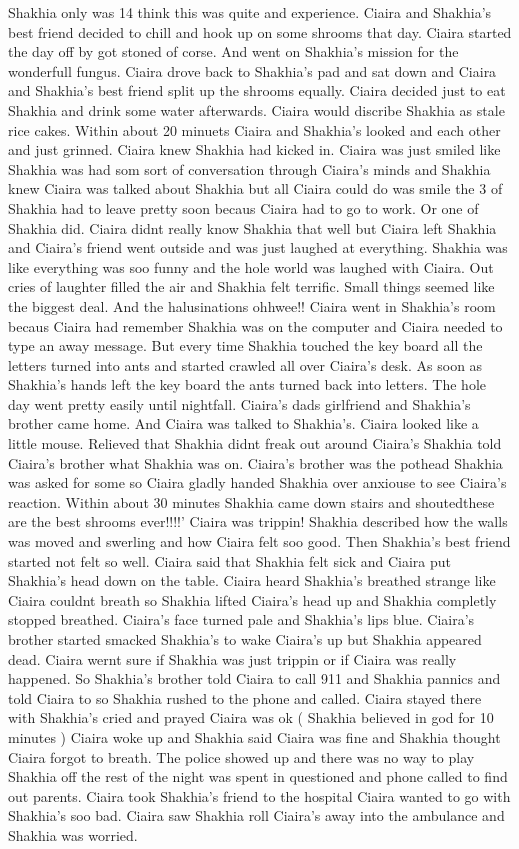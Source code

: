 \documentclass[12pt]{book}
\begin{document}
Shakhia only was 14 think this was quite and experience. Ciaira and Shakhia's best friend decided to chill and hook up on some shrooms that day. Ciaira started the day off by got stoned of corse. And went on Shakhia's mission for the wonderfull fungus. Ciaira drove back to Shakhia's pad and sat down and Ciaira and Shakhia's best friend split up the shrooms equally. Ciaira decided just to eat Shakhia and drink some water afterwards. Ciaira would discribe Shakhia as stale rice cakes. Within about 20 minuets Ciaira and Shakhia's looked and each other and just grinned. Ciaira knew Shakhia had kicked in. Ciaira was just smiled like Shakhia was had som sort of conversation through Ciaira's minds and Shakhia knew Ciaira was talked about Shakhia but all Ciaira could do was smile the 3 of Shakhia had to leave pretty soon becaus Ciaira had to go to work. Or one of Shakhia did. Ciaira didnt really know Shakhia that well but Ciaira left Shakhia and Ciaira's friend went outside and was just laughed at everything. Shakhia was like everything was soo funny and the hole world was laughed with Ciaira. Out cries of laughter filled the air and Shakhia felt terrific. Small things seemed like the biggest deal. And the halusinations ohhwee!! Ciaira went in Shakhia's room becaus Ciaira had remember Shakhia was on the computer and Ciaira needed to type an away message. But every time Shakhia touched the key board all the letters turned into ants and started crawled all over Ciaira's desk. As soon as Shakhia's hands left the key board the ants turned back into letters. The hole day went pretty easily until nightfall. Ciaira's dads girlfriend and Shakhia's brother came home. And Ciaira was talked to Shakhia's. Ciaira looked like a little mouse. Relieved that Shakhia didnt freak out around Ciaira's Shakhia told Ciaira's brother what Shakhia was on. Ciaira's brother was the pothead Shakhia was asked for some so Ciaira gladly handed Shakhia over anxiouse to see Ciaira's reaction. Within about 30 minutes Shakhia came down stairs and shoutedthese are the best shrooms ever!!!!' Ciaira was trippin! Shakhia described how the walls was moved and swerling and how Ciaira felt soo good. Then Shakhia's best friend started not felt so well. Ciaira said that Shakhia felt sick and Ciaira put Shakhia's head down on the table. Ciaira heard Shakhia's breathed strange like Ciaira couldnt breath so Shakhia lifted Ciaira's head up and Shakhia completly stopped breathed. Ciaira's face turned pale and Shakhia's lips blue. Ciaira's brother started smacked Shakhia's to wake Ciaira's up but Shakhia appeared dead. Ciaira wernt sure if Shakhia was just trippin or if Ciaira was really happened. So Shakhia's brother told Ciaira to call 911 and Shakhia pannics and told Ciaira to so Shakhia rushed to the phone and called. Ciaira stayed there with Shakhia's cried and prayed Ciaira was ok ( Shakhia believed in god for 10 minutes ) Ciaira woke up and Shakhia said Ciaira was fine and Shakhia thought Ciaira forgot to breath. The police showed up and there was no way to play Shakhia off the rest of the night was spent in questioned and phone called to find out parents. Ciaira took Shakhia's friend to the hospital Ciaira wanted to go with Shakhia's soo bad. Ciaira saw Shakhia roll Ciaira's away into the ambulance and Shakhia was worried. 
\end{document}
